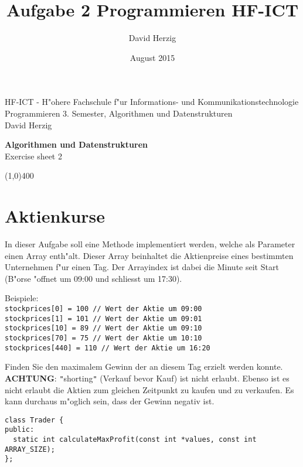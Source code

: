 \documentclass[a4paper,10pt]{article}
\title{Aufgabe 2 Programmieren HF-ICT}
\author{David Herzig}
\date{August 2015}
\begin{document}
HF-ICT - H"ohere Fachschule f"ur Informations- und Kommunikationstechnologie\\
Programmieren 3. Semester, Algorithmen und Datenstrukturen\\
David Herzig

\vspace{2mm}

\begin{center}
{\Large \bf Algorithmen und Datenstrukturen}\\
Exercise sheet 2
\end{center}

\vspace{2mm}

\line(1,0){400}

\vspace{5mm}

\section{Aktienkurse}
In dieser Aufgabe soll eine Methode implementiert werden, welche als Parameter einen Array enth"alt. Dieser
Array beinhaltet die Aktienpreise eines bestimmten Unternehmen f"ur einen Tag. Der Arrayindex ist dabei
die Minute seit Start (B"orse "offnet um 09:00 und schliesst um 17:30).

\vspace{3mm}

Beispiele:\\
\verb|stockprices[0] = 100 // Wert der Aktie um 09:00|\\
\verb|stockprices[1] = 101 // Wert der Aktie um 09:01|\\
\verb|stockprices[10] = 89 // Wert der Aktie um 09:10|\\
\verb|stockprices[70] = 75 // Wert der Aktie um 10:10|\\
\verb|stockprices[440] = 110 // Wert der Aktie um 16:20|

\vspace{3mm}

Finden Sie den maximalem Gewinn der an diesem Tag erzielt werden konnte.\\
{\bf ACHTUNG}: \verb|"|shorting\verb|"| (Verkauf bevor Kauf) ist nicht erlaubt. Ebenso ist es nicht erlaubt
die Aktien zum gleichen Zeitpunkt zu kaufen und zu verkaufen.
Es kann durchaus m"oglich sein, dass der Gewinn negativ ist.

\vspace{3mm}

\begin{lstlisting}
class Trader {
public:
  static int calculateMaxProfit(const int *values, const int ARRAY_SIZE);
};
\end{lstlisting}
\end{document}
